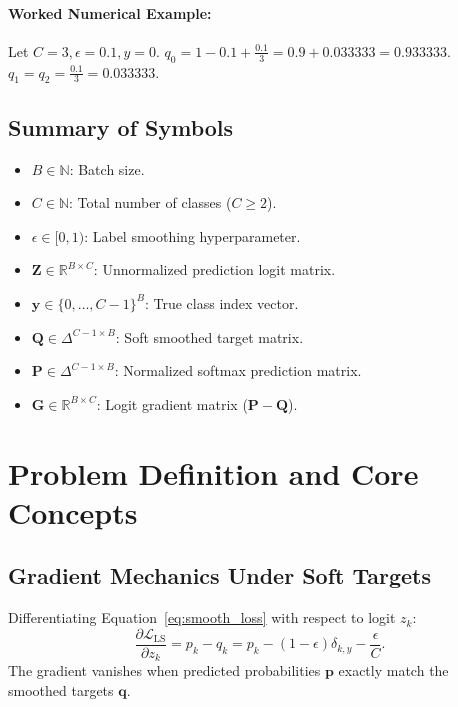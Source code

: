 \documentclass[11pt]{article}
\begin{document}
\paragraph{Worked Numerical Example:}
Let $C = 3, \epsilon = 0.1, y = 0$.
$q_0 = 1 - 0.1 + \frac{0.1}{3} = 0.9 + 0.033333 = 0.933333$.
$q_1 = q_2 = \frac{0.1}{3} = 0.033333$.

\subsection{Summary of Symbols}
\begin{itemize}
    \item $B \in \mathbb{N}$: Batch size.
    \item $C \in \mathbb{N}$: Total number of classes ($C \ge 2$).
    \item $\epsilon \in [0, 1)$: Label smoothing hyperparameter.
    \item $\mathbf{Z} \in \mathbb{R}^{B \times C}$: Unnormalized prediction logit matrix.
    \item $\mathbf{y} \in \{0, \dots, C-1\}^B$: True class index vector.
    \item $\mathbf{Q} \in \Delta^{C-1 \times B}$: Soft smoothed target matrix.
    \item $\mathbf{P} \in \Delta^{C-1 \times B}$: Normalized softmax prediction matrix.
    \item $\mathbf{G} \in \mathbb{R}^{B \times C}$: Logit gradient matrix ($\mathbf{P} - \mathbf{Q}$).
\end{itemize}

\section{Problem Definition and Core Concepts}
\label{sec:problem_definition}

\subsection{Gradient Mechanics Under Soft Targets}
Differentiating Equation~\eqref{eq:smooth_loss} with respect to logit $z_k$:
\begin{equation}
\frac{\partial \mathcal{L}_{\mathrm{LS}}}{\partial z_k} = p_k - q_k = p_k - (1 - \epsilon)\delta_{k, y} - \frac{\epsilon}{C}.
\end{equation}
The gradient vanishes when predicted probabilities $\mathbf{p}$ exactly match the smoothed targets $\mathbf{q}$.
\end{document}
